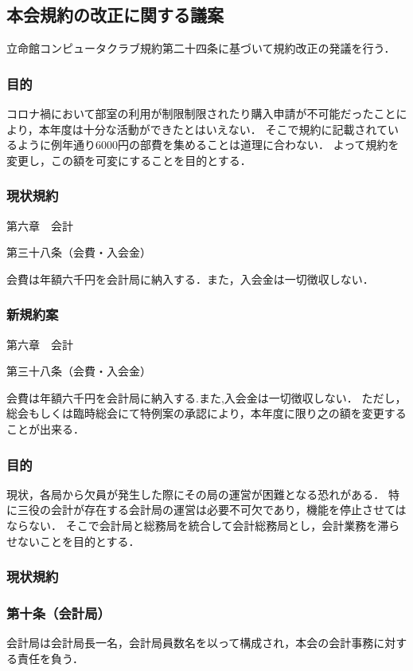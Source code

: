 \subsection*{本会規約の改正に関する議案}

立命館コンピュータクラブ規約第二十四条に基づいて規約改正の発議を行う．

\subsubsection*{目的}
コロナ禍において部室の利用が制限制限されたり購入申請が不可能だったことにより，本年度は十分な活動ができたとはいえない．
そこで規約に記載されているように例年通り6000円の部費を集めることは道理に合わない．
よって規約を変更し，この額を可変にすることを目的とする．

\subsubsection*{現状規約}
第六章　会計

第三十八条（会費・入会金）

会費は年額六千円を会計局に納入する．また，入会金は一切徴収しない．

\subsubsection*{新規約案}
第六章　会計

第三十八条（会費・入会金）

会費は年額六千円を会計局に納入する.また,入会金は一切徴収しない．
ただし，総会もしくは臨時総会にて特例案の承認により，本年度に限り之の額を変更することが出来る．

\subsubsection*{目的}
現状，各局から欠員が発生した際にその局の運営が困難となる恐れがある．
特に三役の会計が存在する会計局の運営は必要不可欠であり，機能を停止させてはならない．
そこで会計局と総務局を統合して会計総務局とし，会計業務を滞らせないことを目的とする．

\subsubsection*{現状規約}
\subsubsection*{第十条（会計局）}
会計局は会計局長一名，会計局員数名を以って構成され，本会の会計事務に対する責任を負う．

